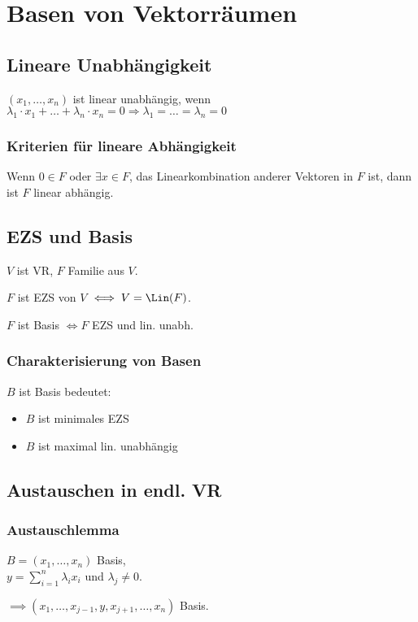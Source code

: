 \section*{Basen von Vektorräumen}

\subsection*{Lineare Unabhängigkeit}
$(x_1, \dots, x_n)$ ist linear unabhängig, wenn \\
$\lambda_1\cdot x_1 + \dots + \lambda_n \cdot x_n = 0 \Rightarrow \lambda_1 = \dots = \lambda_n = 0$

\subsubsection*{Kriterien für lineare Abhängigkeit}
Wenn $0\in F$ oder $\exists x\in F$, das Linearkombination anderer Vektoren in $F$ ist, dann ist $F$ linear abhängig.

\subsection*{EZS und Basis}
$V$ ist VR, $F$ Familie aus $V$.

$F$ ist EZS von $V$ $\iff V=\Lin(F)$.

$F$ ist Basis $\iff F$ EZS und lin. unabh. 

\subsubsection*{Charakterisierung von Basen}
$B$ ist Basis bedeutet:
\begin{itemize}
	\item $B$ ist minimales EZS
	\item $B$ ist maximal lin. unabhängig
\end{itemize}

\subsection*{Austauschen in endl. VR}
\subsubsection*{Austauschlemma}
$B=(x_1,\dots,x_n)$ Basis, \\
$\displaystyle y=\sum_{i=1}^n \lambda_i x_i$ und $\lambda_j \neq 0$.

$\implies (x_1,\dots,x_{j-1},y,x_{j+1},\dots,x_n)$ Basis.

